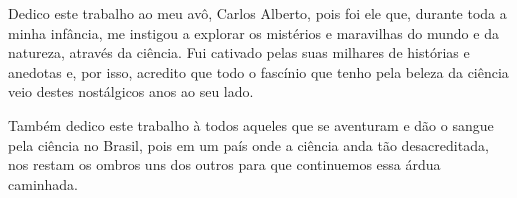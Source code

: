 
Dedico este trabalho ao meu avô, Carlos Alberto, pois foi ele que, durante toda a minha infância, me instigou a explorar os mistérios e maravilhas do mundo e da natureza, através da ciência. Fui cativado pelas suas milhares de histórias e anedotas e, por isso, acredito que todo o fascínio que tenho pela beleza da ciência veio destes nostálgicos anos ao seu lado.

Também dedico este trabalho à todos aqueles que se aventuram e dão o sangue pela ciência no Brasil, pois em um país onde a ciência anda tão desacreditada, nos restam os ombros uns dos outros para que continuemos essa árdua caminhada.